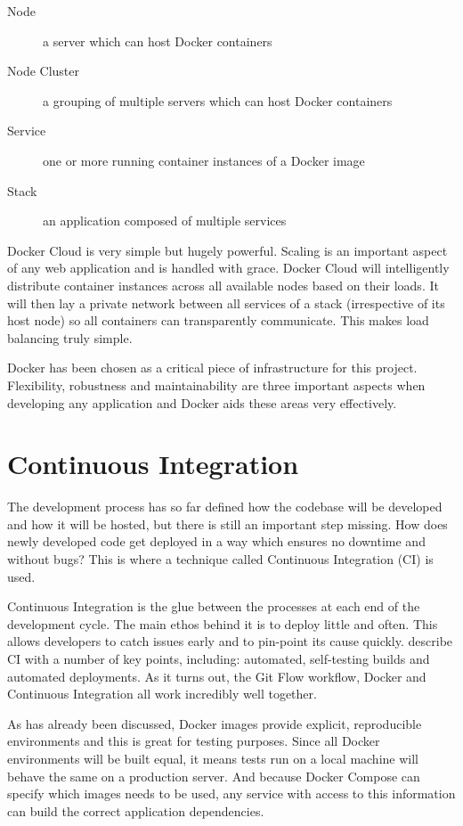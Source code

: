     \begin{description}
      \item[Node] a server which can host Docker containers
      \item[Node Cluster] a grouping of multiple servers which can host Docker containers
      \item[Service] one or more running container instances of a Docker image
      \item[Stack] an application composed of multiple services
    \end{description}

    Docker Cloud is very simple but hugely powerful. Scaling is an important aspect of any web application and is handled with grace. Docker Cloud will intelligently distribute container instances across all available nodes based on their loads. It will then lay a private network between all services of a stack (irrespective of its host node) so all containers can transparently communicate. This makes load balancing truly simple.

    Docker has been chosen as a critical piece of infrastructure for this project. Flexibility, robustness and maintainability are three important aspects when developing any application and Docker aids these areas very effectively.

  \section{Continuous Integration}
    The development process has so far defined how the codebase will be developed and how it will be hosted, but there is still an important step missing. How does newly developed code get deployed in a way which ensures no downtime and without bugs? This is where a technique called Continuous Integration (CI) is used.

    Continuous Integration is the glue between the processes at each end of the development cycle. The main ethos behind it is to deploy little and often. This allows developers to catch issues early and to pin-point its cause quickly. \citet{continuous-integration} describe CI with a number of key points, including: automated, self-testing builds and automated deployments. As it turns out, the Git Flow workflow, Docker and Continuous Integration all work incredibly well together.

    As has already been discussed, Docker images provide explicit, reproducible environments and this is great for testing purposes. Since all Docker environments will be built equal, it means tests run on a local machine will behave the same on a production server. And because Docker Compose can specify which images needs to be used, any service with access to this information can build the correct application dependencies.

